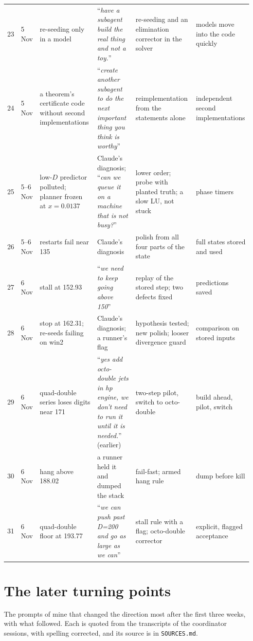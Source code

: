 \documentclass[aps,prd,onecolumn,superscriptaddress,nofootinbib,10pt]{revtex4-2}
\newcommand{\file}[1]{\texttt{#1}}
\newcommand{\prompt}[1]{``\textit{#1}''}
\begin{document}
\begin{center}
\begin{tabular}{rL{1.05cm}L{3.5cm}L{3.9cm}L{3.6cm}L{3.3cm}}
23 & 5 Nov & re-seeding only in a model & \prompt{have a subagent build the real thing and not a toy.} & re-seeding and an elimination corrector in the solver & models move into the code quickly\\
24 & 5 Nov & a theorem's certificate code without second implementations & \prompt{create another subagent to do the next important thing you think is worthy} & reimplementation from the statements alone & independent second implementations\\
25 & 5--6 Nov & low-$D$ predictor polluted; planner frozen at $x = 0.0137$ & Claude's diagnosis; \prompt{can we queue it on a machine that is not busy?} & lower order; probe with planted truth; a slow LU, not stuck & phase timers\\
26 & 5--6 Nov & restarts fail near 135 & Claude's diagnosis & polish from all four parts of the state & full states stored and used\\
27 & 6 Nov & stall at 152.93 & \prompt{we need to keep going above 150} & replay of the stored step; two defects fixed & predictions saved\\
28 & 6 Nov & stop at 162.31; re-seeds failing on win2 & Claude's diagnosis; a runner's flag & hypothesis tested; new polish; looser divergence guard & comparison on stored inputs\\
29 & 6 Nov & quad-double series loses digits near 171 & \prompt{yes add octo-double jets in hp engine, we don't need to run it until it is needed.} (earlier) & two-step pilot, switch to octo-double & build ahead, pilot, switch\\
30 & 6 Nov & hang above 188.02 & a runner held it and dumped the stack & fail-fast; armed hang rule & dump before kill\\
31 & 6 Nov & quad-double floor at 193.77 & \prompt{we can push past D=200 and go as large as we can} & stall rule with a flag; octo-double corrector & explicit, flagged acceptance\\
\bottomrule
\end{tabular}
\end{center}

\section{The later turning points}
\label{app:stuck2}

The prompts of mine that changed the direction most after the first three weeks, with what followed. Each is quoted from the
transcripts of the coordinator sessions, with spelling corrected, and its source is in \file{SOURCES.md}.
\end{document}
